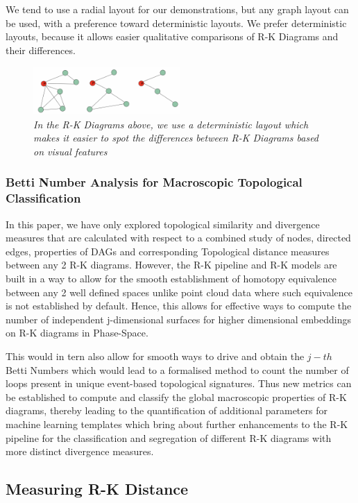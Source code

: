 We tend to use a radial layout for our demonstrations, but any graph layout can be used, with a preference toward deterministic layouts. We prefer deterministic layouts, because it allows easier qualitative comparisons of R-K Diagrams and their differences.

\begin{figure}[H]
	\centering
        \includegraphics[width=0.5\textwidth]{images/rk-diagram-layouts.png}
	\caption{\textit{In the R-K Diagrams above, we use a deterministic layout which makes it easier to spot the differences between R-K Diagrams based on visual features}}
	\label{fig:linker}
\end{figure}

\subsubsection{Betti Number Analysis for Macroscopic Topological Classification}
\label{sec:BettiNumber}
In this paper, we have only explored topological similarity and divergence measures that are calculated with respect to a combined study of nodes, directed edges, properties of DAGs and corresponding Topological distance measures between any 2 R-K diagrams. However, the R-K pipeline and R-K models are built in a way to allow for the smooth establishment of homotopy equivalence between any 2 well defined spaces unlike point cloud data where such equivalence is not established by default. Hence, this allows for effective ways to compute the number of independent j-dimensional surfaces for higher dimensional embeddings on R-K diagrams in Phase-Space. 

This would in tern also allow for smooth ways to drive and obtain the $j-th$ Betti Numbers which would lead to a formalised method to count the number of loops present in unique event-based topological signatures. Thus new metrics can be established to compute and classify the global macroscopic properties of R-K diagrams, thereby leading to the quantification of additional parameters for machine learning templates which bring about further enhancements to the R-K pipeline for the classification and segregation of different R-K diagrams with more distinct divergence measures.
 
\subsection{Measuring R-K Distance}
\label{sec:rk_distance}

